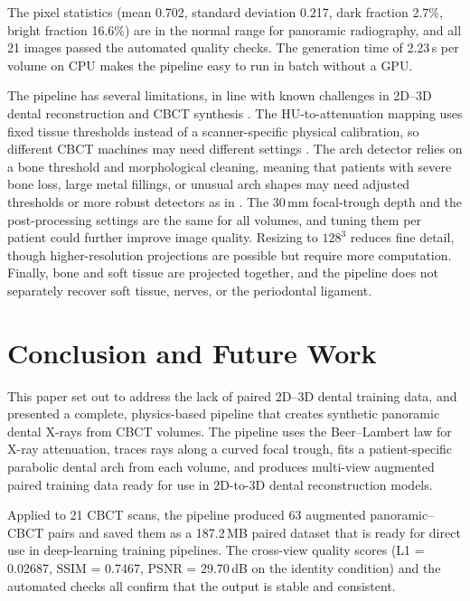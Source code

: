 \documentclass[conference]{IEEEtran}
\begin{document}
The pixel statistics (mean 0.702, standard deviation 0.217, dark fraction 2.7\%, bright fraction 16.6\%) are in the normal range for panoramic radiography, and all 21 images passed the automated quality checks. The generation time of 2.23\,s per volume on CPU makes the pipeline easy to run in batch without a GPU.

The pipeline has several limitations, in line with known challenges in 2D--3D dental reconstruction \cite{park2024nebla,parida2025vit,wang2024neural,shin2025sparse} and CBCT synthesis \cite{sunilkumar2024recent,sunilkumar2025panoramic}. The HU-to-attenuation mapping uses fixed tissue thresholds instead of a scanner-specific physical calibration, so different CBCT machines may need different settings \cite{oliveira2025digital}. The arch detector relies on a bone threshold and morphological cleaning, meaning that patients with severe bone loss, large metal fillings, or unusual arch shapes may need adjusted thresholds or more robust detectors as in \cite{abdi2015automatic,lian2020deep}. The 30\,mm focal-trough depth and the post-processing settings are the same for all volumes, and tuning them per patient could further improve image quality. Resizing to $128^3$ reduces fine detail, though higher-resolution projections are possible but require more computation. Finally, bone and soft tissue are projected together, and the pipeline does not separately recover soft tissue, nerves, or the periodontal ligament.

\section{Conclusion and Future Work}
\label{sec:conclusion}

This paper set out to address the lack of paired 2D--3D dental training data, and presented a complete, physics-based pipeline that creates synthetic panoramic dental X-rays from CBCT volumes. The pipeline uses the Beer--Lambert law for X-ray attenuation, traces rays along a curved focal trough, fits a patient-specific parabolic dental arch from each volume, and produces multi-view augmented paired training data ready for use in 2D-to-3D dental reconstruction models.

Applied to 21 CBCT scans, the pipeline produced 63 augmented panoramic--CBCT pairs and saved them as a 187.2\,MB paired dataset that is ready for direct use in deep-learning training pipelines. The cross-view quality scores (L1 = 0.02687, SSIM = 0.7467, PSNR = 29.70\,dB on the identity condition) and the automated checks all confirm that the output is stable and consistent.
\end{document}
